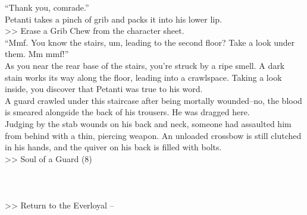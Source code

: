 “Thank you, comrade.”\\

Petanti takes a pinch of grib and packs it into his lower lip.\\
>> Erase a Grib Chew from the character sheet.\\

“Mmf. You know the stairs, um, leading to the second floor? Take a look under them. Mm mmf!”\\

As you near the rear base of the stairs, you’re struck by a ripe smell. A dark stain works its way along the floor, leading into a crawlspace. Taking a look inside, you discover that Petanti was true to his word.\\

A guard crawled under this staircase after being mortally wounded--no, the blood is smeared alongside the back of his trousers. He was dragged here.\\

Judging by the stab wounds on his back and neck, someone had assaulted him from behind with a thin, piercing weapon. An unloaded crossbow is still clutched in his hands, and the quiver on his back is filled with bolts.\\
>> Soul of a Guard (8)\\
\\
\\
\\

>> Return to the Everloyal -- 